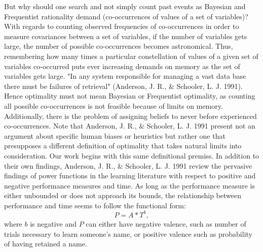 But why should one search and not simply count past events as Bayesian and Frequentist rationality demand (co-occurrences of values of a set of variables)?  With regards to counting observed frequencies of co-occurrences in order to measure covariances between a set of variables, if the number of variables gets large, the number of possible co-occurrences becomes astronomical.  Thus, remembering how many times a particular constellation of values of a given set of variables co-occurred puts ever increasing demands on memory as the set of variables gets large.  "In any system responsible for managing a vast data base there must be failures of retrieval" (Anderson, J. R., \& Schooler, L. J. 1991).  Hence optimality must not mean Bayesian or Frequentist optimality, as counting all possible co-occurrences is not feasible because of limits on memory.  Additionally, there is the problem of assigning beliefs to never before experienced co-occurrences.  Note that Anderson, J. R., \& Schooler, L. J. 1991 present not an argument about specific human biases or heuristics but rather one that presupposes a different definition of optimality that takes natural limits into consideration.  Our work begins with this same definitional premiss.  In addition to their own findings, Anderson, J. R., \& Schooler, L. J. 1991 review the pervasive findings of power functions in the learning literature with respect to positive and negative performance measures and time.  As long as the performance measure is either unbounded or does not approach its bounds, the relationship between performance and time seems to follow the functional form:
$$P = A*T^{b},$$
where $b$ is negative and $P$ can either have negative valence, such as number of trials necessary to learn someone's name, or positive valence such as probability of having retained a name. 




